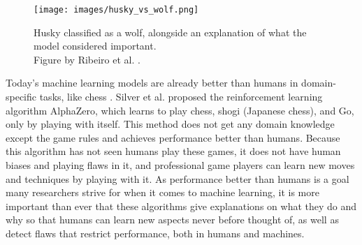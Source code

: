 \begin{figure}[htb]
    \centering
    \texttt{[image: images/husky\_vs\_wolf.png]}
    \caption[Husky classified as a wolf, alongside an explanation of what the model considered important.]{Husky classified as a wolf, alongside an explanation of what the model considered important.\\ Figure by Ribeiro et al. \cite{ribeiroWhyShouldTrust2016}.}
    \label{fig:wolf_husky}
\end{figure} 


Today's machine learning models are already better than humans in domain-specific tasks, like chess \cite{campbellDeepBlue2002}. Silver et al. \cite{silverGeneralReinforcementLearning2018} proposed the reinforcement learning algorithm AlphaZero, which learns to play chess, shogi (Japanese chess), and Go, only by playing with itself. This method does not get any domain knowledge except the game rules and achieves performance better than humans. Because this algorithm has not seen humans play these games, it does not have human biases and playing flaws in it, and professional game players can learn new moves and techniques by playing with it. 
As performance better than humans is a goal many researchers strive for when it comes to machine learning, it is more important than ever that these algorithms give explanations on what they do and why so that humans can learn new aspects never before thought of, as well as detect flaws that restrict performance, both in humans and machines.

